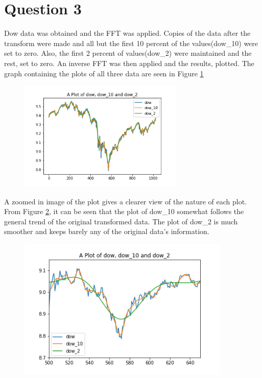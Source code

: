 \documentclass[11pt]{article}
\begin{document}
	\section{Question 3}
	Dow data was obtained and the FFT was applied. Copies of the data after the transform were made and all but the first 10 percent of the values(dow\_10) were set to zero. Also, the first 2 percent of values(dow\_2) were maintained and the rest, set to zero. An inverse FFT was then applied and the results, plotted.
	The graph containing the plots of all three data are seen in Figure \ref{fig:dows}
	\begin{figure}[!htb]\begin{center} 
			\vspace{12pt}
			\includegraphics[width=0.7\textwidth]{dows.png}
			\label{fig:dows} 
		\end{center}
	\end{figure}
	
	
	A zoomed in image of the plot gives a clearer view of the nature of each plot. From Figure \ref{fig:dow_zoomed}, it can be seen that the plot of dow\_10 somewhat follows the general trend of the original transformed data. The plot of dow\_2 is much smoother and keeps barely any of the original data's information.  
	\begin{figure}[!htb]\begin{center} 
		\vspace{12pt}
		\includegraphics[width=0.9\textwidth]{dow_zoomed.png}
		\label{fig:dow_zoomed} 
	\end{center}
	\end{figure}
			
\end{document}
